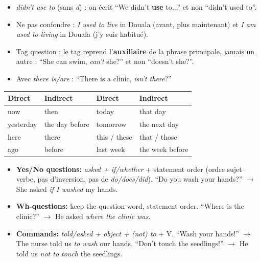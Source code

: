 \documentclass[11pt]{article}
\begin{document}
\begin{attention}
\begin{itemize}
\item \emph{didn't use to} (sans \emph{d}) : on écrit ``We didn't \textbf{use} to...'' et non ``didn't used to''.
\item Ne pas confondre : \emph{I used to live} in Douala (avant, plus maintenant) et \emph{I am used to living} in Douala (j'y suis habitué).
\item Tag question : le tag reprend l'\textbf{auxiliaire} de la phrase principale, jamais un autre : ``She can swim, \emph{can't} she?'' et non ``doesn't she?''.
\item Avec \emph{there is/are} : ``There is a clinic, \emph{isn't there}?''
\end{itemize}
\end{attention}

\begin{propriete}
\begin{center}
\begin{tabularx}{\linewidth}{|X|X|X|X|}\hline
\rowcolor{popgreenL} \textbf{Direct} & \textbf{Indirect} & \textbf{Direct} & \textbf{Indirect} \\ \hline
now & then & today & that day \\ \hline
yesterday & the day before & tomorrow & the next day \\ \hline
here & there & this / these & that / those \\ \hline
ago & before & last week & the week before \\ \hline
\end{tabularx}
\end{center}
\end{propriete}

\begin{propriete}
\begin{itemize}
\item \textbf{Yes/No questions:} \emph{asked + if/whether} + statement order (ordre sujet--verbe, pas d'inversion, pas de \emph{do/does/did}). ``Do you wash your hands?'' $\to$ She asked \emph{if I washed} my hands.
\item \textbf{Wh-questions:} keep the question word, statement order. ``Where is the clinic?'' $\to$ He asked \emph{where the clinic was}.
\item \textbf{Commands:} \emph{told/asked + object + (not) to} + V. ``Wash your hands!'' $\to$ The nurse told us \emph{to wash} our hands. ``Don't touch the seedlings!'' $\to$ He told us \emph{not to touch} the seedlings.
\end{itemize}
\end{propriete}
\end{document}
